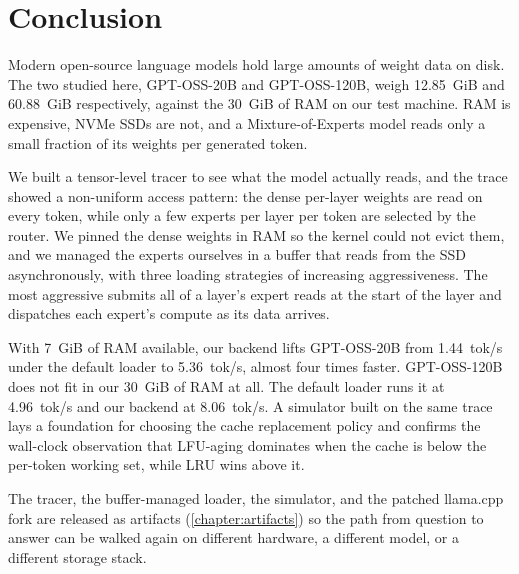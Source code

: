 \section{Conclusion}\label{sec:thesis-conclusion}

Modern open-source language models hold large amounts of weight data on disk.
The two studied here, GPT-OSS-20B and GPT-OSS-120B, weigh 12.85~GiB and 60.88~GiB respectively, against the 30~GiB of RAM on our test machine.
RAM is expensive, NVMe SSDs are not, and a Mixture-of-Experts model reads only a small fraction of its weights per generated token.

We built a tensor-level tracer to see what the model actually reads, and the trace showed a non-uniform access pattern: the dense per-layer weights are read on every token, while only a few experts per layer per token are selected by the router.
We pinned the dense weights in RAM so the kernel could not evict them, and we managed the experts ourselves in a buffer that reads from the SSD asynchronously, with three loading strategies of increasing aggressiveness.
The most aggressive submits all of a layer's expert reads at the start of the layer and dispatches each expert's compute as its data arrives.

With 7~GiB of RAM available, our backend lifts GPT-OSS-20B from 1.44~tok/s under the default loader to 5.36~tok/s, almost four times faster.
GPT-OSS-120B does not fit in our 30~GiB of RAM at all.
The default loader runs it at 4.96~tok/s and our backend at 8.06~tok/s.
A simulator built on the same trace lays a foundation for choosing the cache replacement policy and confirms the wall-clock observation that LFU-aging dominates when the cache is below the per-token working set, while LRU wins above it.

The tracer, the buffer-managed loader, the simulator, and the patched llama.cpp fork are released as artifacts (\autoref{chapter:artifacts}) so the path from question to answer can be walked again on different hardware, a different model, or a different storage stack.
